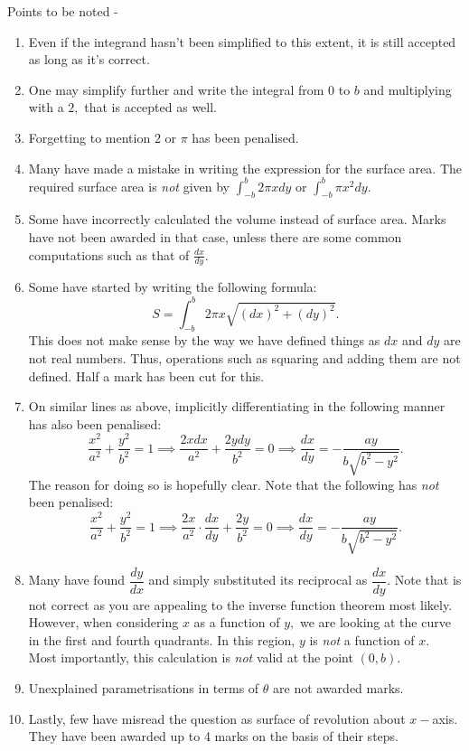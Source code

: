 \documentclass{article}
\begin{document}
Points to be noted -
\begin{enumerate} 
	\item Even if the integrand hasn't been simplified to this extent, it is still accepted as long as it's correct.
	\item One may simplify further and write the integral from $0$ to $b$ and multiplying with a $2,$ that is accepted as well.
	\item Forgetting to mention $2$ or $\pi$ has been penalised.
	\item Many have made a mistake in writing the expression for the surface area. The required surface area is \emph{not} given by $\displaystyle\int_{-b}^{b} 2\pi x dy $ or $\displaystyle\int_{-b}^{b} \pi x^2 dy.$
	\item Some have incorrectly calculated the volume instead of surface area. Marks have not been awarded in that case, unless there are some common computations such as that of $\frac{dx}{dy}.$
	\item Some have started by writing the following formula:
	\[S = \int_{-b}^{b} 2\pi x \sqrt{(dx)^2 + (dy)^2}.\]
	This does not make sense by the way we have defined things as $dx$ and $dy$ are not real numbers. Thus, operations such as squaring and adding them are not defined. Half a mark has been cut for this.
	\item On similar lines as above, implicitly differentiating in the following manner has also been penalised:
	\[\dfrac{x^2}{a^2} + \dfrac{y^2}{b^2} = 1 \implies \dfrac{2xdx}{a^2} + \dfrac{2ydy}{b^2} = 0 \implies \dfrac{dx}{dy} = -\dfrac{ay}{b\sqrt{b^2 - y^2}}.\]
	The reason for doing so is hopefully clear. Note that the following has \emph{not} been penalised:
	\[\dfrac{x^2}{a^2} + \dfrac{y^2}{b^2} = 1 \implies \dfrac{2x}{a^2}\cdot\dfrac{dx}{dy} + \dfrac{2y}{b^2} = 0 \implies \dfrac{dx}{dy} = -\dfrac{ay}{b\sqrt{b^2 - y^2}}.\]
	\item Many have found $\dfrac{dy}{dx}$ and simply substituted its reciprocal as $\dfrac{dx}{dy}.$ Note that is not correct as you are appealing to the inverse function theorem most likely. However, when considering $x$ as a function of $y,$ we are looking at the curve in the first and fourth quadrants. In this region, $y$ is \emph{not} a function of $x.$\\
	Most importantly, this calculation is \emph{not} valid at the point $(0, b).$
	\item Unexplained parametrisations in terms of $\theta$ are not awarded marks.
	\item Lastly, few have misread the question as surface of revolution about $x-$axis. They have been awarded up to 4 marks on the basis of their steps.
\end{enumerate}
\end{document}
